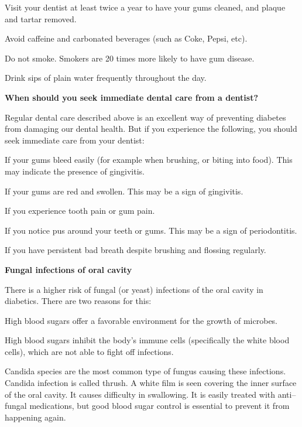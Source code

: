 { \item Visit your dentist at least twice a year to have your gums cleaned, and plaque and tartar removed.

 \item Avoid caffeine and carbonated beverages (such as Coke, Pepsi, etc).

 \item Do not smoke. Smokers are 20 times more likely to have gum disease.

 \item Drink sips of plain water frequently throughout the day.

\textbf{When should you seek immediate dental care from a dentist?}

Regular dental care described above is an excellent way of preventing diabetes from damaging our dental health. But if you experience the following, you should seek immediate care from your dentist:

\item If your gums bleed easily (for example when brushing, or biting into food). This may indicate the presence of gingivitis.

 \item If your gums are red and swollen. This may be a sign of gingivitis.

 \item If you experience tooth pain or gum pain.

 \item If you notice pus around your teeth or gums. This may be a sign of periodontitis.

 \item If you have persistent bad breath despite brushing and flossing regularly.

\textbf{Fungal infections of oral cavity}

There is a higher risk of fungal (or yeast) infections of the oral cavity in diabetics. There are two reasons for this:

\item High blood sugars offer a favorable environment for the growth of microbes.

 \item High blood sugars inhibit the body’s immune cells (specifically the white blood cells), which are not able to fight off infections.

Candida species are the most common type of fungus causing these infections. Candida infection is called thrush. A white film is seen covering the inner surface of the oral cavity. It causes difficulty in swallowing. It is easily treated with anti–fungal medications, but good blood sugar control is essential to prevent it from happening again.

}
